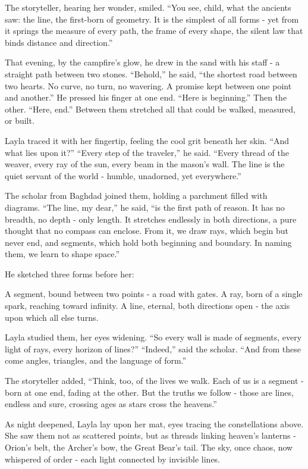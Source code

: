 \documentclass[
  letterpaper,
  DIV=11,
  numbers=noendperiod]{scrreprt}
\begin{document}
The storyteller, hearing her wonder, smiled. ``You see, child, what the
ancients saw: the line, the first-born of geometry. It is the simplest
of all forms - yet from it springs the measure of every path, the frame
of every shape, the silent law that binds distance and direction.''

That evening, by the campfire's glow, he drew in the sand with his staff
- a straight path between two stones. ``Behold,'' he said, ``the
shortest road between two hearts. No curve, no turn, no wavering. A
promise kept between one point and another.'' He pressed his finger at
one end. ``Here is beginning.'' Then the other. ``Here, end.'' Between
them stretched all that could be walked, measured, or built.

Layla traced it with her fingertip, feeling the cool grit beneath her
skin. ``And what lies upon it?'' ``Every step of the traveler,'' he
said. ``Every thread of the weaver, every ray of the sun, every beam in
the mason's wall. The line is the quiet servant of the world - humble,
unadorned, yet everywhere.''

The scholar from Baghdad joined them, holding a parchment filled with
diagrams. ``The line, my dear,'' he said, ``is the first path of reason.
It has no breadth, no depth - only length. It stretches endlessly in
both directions, a pure thought that no compass can enclose. From it, we
draw rays, which begin but never end, and segments, which hold both
beginning and boundary. In naming them, we learn to shape space.''

He sketched three forms before her:

A segment, bound between two points - a road with gates. A ray, born of
a single spark, reaching toward infinity. A line, eternal, both
directions open - the axis upon which all else turns.

Layla studied them, her eyes widening. ``So every wall is made of
segments, every light of rays, every horizon of lines?'' ``Indeed,''
said the scholar. ``And from these come angles, triangles, and the
language of form.''

The storyteller added, ``Think, too, of the lives we walk. Each of us is
a segment - born at one end, fading at the other. But the truths we
follow - those are lines, endless and sure, crossing ages as stars cross
the heavens.''

As night deepened, Layla lay upon her mat, eyes tracing the
constellations above. She saw them not as scattered points, but as
threads linking heaven's lanterns - Orion's belt, the Archer's bow, the
Great Bear's tail. The sky, once chaos, now whispered of order - each
light connected by invisible lines.
\end{document}
